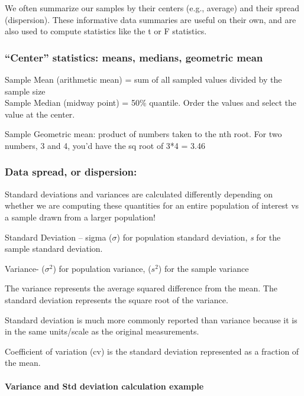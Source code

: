\documentclass[
]{article}
\begin{document}
We often summarize our samples by their centers (e.g., average) and
their spread (dispersion). These informative data summaries are useful
on their own, and are also used to compute statistics like the t or F
statistics.

\hypertarget{center-statistics-means-medians-geometric-mean}{%
\subsubsection{``Center'' statistics: means, medians, geometric
mean}\label{center-statistics-means-medians-geometric-mean}}

Sample Mean (arithmetic mean) = sum of all sampled values divided by the
sample size\\
Sample Median (midway point) = 50\% quantile. Order the values and
select the value at the center.

Sample Geometric mean: product of numbers taken to the nth root. For two
numbers, 3 and 4, you'd have the sq root of 3*4 = 3.46

\hypertarget{data-spread-or-dispersion}{%
\subsubsection{Data spread, or
dispersion:}\label{data-spread-or-dispersion}}

Standard deviations and variances are calculated differently depending
on whether we are computing these quantities for an entire population of
interest vs a sample drawn from a larger population!

Standard Deviation -- sigma (\(\sigma\)) for population standard
deviation, \emph{s} for the sample standard deviation.

Variance- (\(\sigma^2\)) for population variance, (\(s^2\)) for the
sample variance

The variance represents the average squared difference from the mean.
The standard deviation represents the square root of the variance.

Standard deviation is much more commonly reported than variance because
it is in the same units/scale as the original measurements.

Coefficient of variation (cv) is the standard deviation represented as a
fraction of the mean.

\hypertarget{variance-and-std-deviation-calculation-example}{%
\paragraph{Variance and Std deviation calculation
example}\label{variance-and-std-deviation-calculation-example}}
\end{document}
